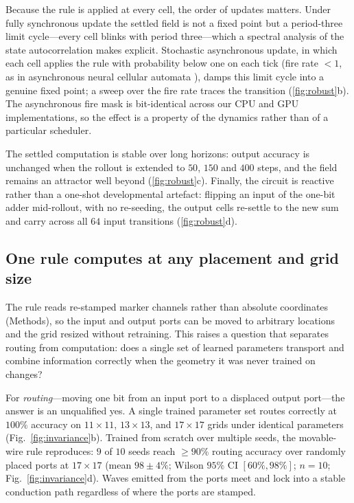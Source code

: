 Because the rule is applied at every cell, the order of updates matters. Under fully synchronous update the settled field is not a fixed point but a period-three limit cycle---every cell blinks with period three---which a spectral analysis of the state autocorrelation makes explicit. Stochastic asynchronous update, in which each cell applies the rule with probability below one on each tick (fire rate $<1$, as in asynchronous neural cellular automata \citep{mordvintsev2020growing}), damps this limit cycle into a genuine fixed point; a sweep over the fire rate traces the transition (\ref{fig:robust}b). The asynchronous fire mask is bit-identical across our CPU and GPU implementations, so the effect is a property of the dynamics rather than of a particular scheduler.

The settled computation is stable over long horizons: output accuracy is unchanged when the rollout is extended to $50$, $150$ and $400$ steps, and the field remains an attractor well beyond (\ref{fig:robust}c). Finally, the circuit is reactive rather than a one-shot developmental artefact: flipping an input of the one-bit adder mid-rollout, with no re-seeding, the output cells re-settle to the new sum and carry across all $64$ input transitions (\ref{fig:robust}d).

\subsection{One rule computes at any placement and grid size}
\label{sec:invariance}

The rule reads re-stamped marker channels rather than absolute coordinates (Methods), so the input and output ports can be moved to arbitrary locations and the grid resized without retraining. This raises a question that separates routing from computation: does a single set of learned parameters transport and combine information correctly when the geometry it was never trained on changes?

For \emph{routing}---moving one bit from an input port to a displaced output port---the answer is an unqualified yes. A single trained parameter set routes correctly at $100\%$ accuracy on $11\times11$, $13\times13$, and $17\times17$ grids under identical parameters (Fig.~\ref{fig:invariance}b). Trained from scratch over multiple seeds, the movable-wire rule reproduces: $9$ of $10$ seeds reach $\ge 90\%$ routing accuracy over randomly placed ports at $17\times17$ (mean $98\pm4\%$; Wilson $95\%$ CI $[60\%,98\%]$; $n=10$; Fig.~\ref{fig:invariance}d). Waves emitted from the ports meet and lock into a stable conduction path regardless of where the ports are stamped.

